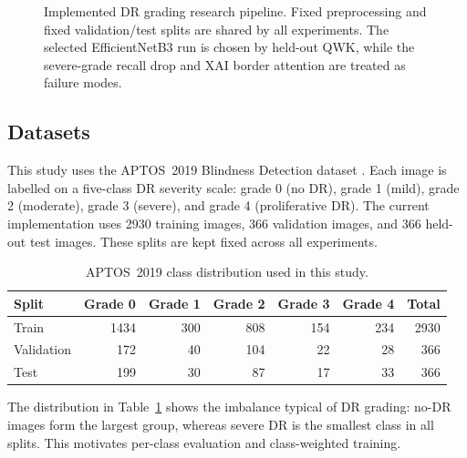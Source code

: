 \documentclass[11pt,a4paper]{article}
\begin{document}
\begin{figure}[t]
{
  }
  \caption{Implemented DR grading research pipeline. Fixed preprocessing and
  fixed validation/test splits are shared by all experiments. The selected
  EfficientNetB3 run is chosen by held-out QWK, while the severe-grade recall
  drop and XAI border attention are treated as failure modes.}
  \label{fig:research-pipeline}
\end{figure}

\subsection{Datasets}
This study uses the APTOS~2019 Blindness Detection dataset \cite{aptos2019}. Each image is labelled on a five-class DR severity scale: grade 0 (no DR), grade 1 (mild), grade 2 (moderate), grade 3 (severe), and grade 4 (proliferative DR). The current implementation uses \num{2930} training images, \num{366} validation images, and \num{366} held-out test images. These splits are kept fixed across all experiments.

\begin{table}[t]
  \centering
  \caption{APTOS~2019 class distribution used in this study.}
  \label{tab:class-distribution}
  \begin{tabular}{lrrrrrr}
    \toprule
    Split & Grade 0 & Grade 1 & Grade 2 & Grade 3 & Grade 4 & Total \\
    \midrule
    Train & 1434 & 300 & 808 & 154 & 234 & 2930 \\
    Validation & 172 & 40 & 104 & 22 & 28 & 366 \\
    Test & 199 & 30 & 87 & 17 & 33 & 366 \\
    \bottomrule
  \end{tabular}
\end{table}

The distribution in Table~\ref{tab:class-distribution} shows the imbalance typical of DR grading: no-DR images form the largest group, whereas severe DR is the smallest class in all splits. This motivates per-class evaluation and class-weighted training.
\end{document}
